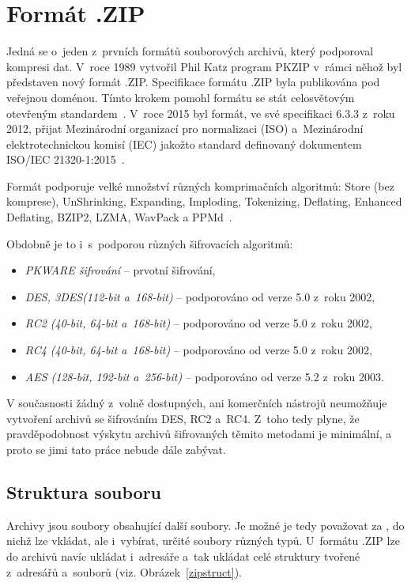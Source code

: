 \section{Formát .ZIP}
Jedná se o~jeden z~prvních formátů souborových archivů, který podporoval kompresi dat. V~roce 1989
vytvořil Phil Katz program PKZIP v~rámci něhož byl představen nový formát .ZIP. Specifikace
formátu .ZIP byla publikována pod veřejnou doménou. Tímto krokem pomohl formátu se stát
celosvětovým otevřeným standardem~\cite{PKWARE:2015}. V~roce 2015 byl formát, ve své specifikaci
6.3.3 z~roku 2012, přijat Mezinárodní organizací pro normalizaci (ISO) a~Mezinárodní
elektrotechnickou komisí (IEC) jakožto standard definovaný dokumentem ISO/IEC
21320-1:2015~\cite{ISOIEC:2015}.

 Formát podporuje velké množství různých komprimačních algoritmů: Store (bez komprese),
UnShrinking, Expanding, Imploding, Tokenizing, Deflating, Enhanced Deflating, BZIP2, LZMA, WavPack
a PPMd~\cite{PKWARE:2014}. 

 Obdobně je to i~s~podporou různých šifrovacích algoritmů:
\begin{itemize}
    \item {\it PKWARE šifrování} -- prvotní šifrování,
    \item {\it DES, 3DES(112-bit a~168-bit)} -- podporováno od verze 5.0 z~roku 2002,
    \item {\it RC2 (40-bit, 64-bit a~168-bit)} -- podporováno od verze 5.0 z~roku 2002,
    \item {\it RC4 (40-bit, 64-bit a~168-bit)} -- podporováno od verze 5.0 z~roku 2002,
    \item {\it AES (128-bit, 192-bit a~256-bit)} -- podporováno od verze 5.2 z~roku 2003.
\end{itemize}
V současnosti žádný z~volně dostupných, ani komerčních nástrojů neumožňuje vytvoření archivů se
šifrováním DES, RC2 a~RC4. Z~toho tedy plyne, že pravděpodobnost výskytu archivů šifrovaných těmito
metodami je minimální, a proto se jimi tato práce nebude dále zabývat.

\subsection{Struktura souboru}
\label{ssec:zip_struct}
Archivy jsou soubory obsahující další soubory. Je možné je tedy považovat za , do nichž
lze vkládat, ale i~vybírat, určité soubory různých typů. U~formátu .ZIP lze do archivů navíc ukládat
i~adresáře a~tak ukládat celé struktury tvořené z~adresářů a~souborů (viz. Obrázek~\ref{zipstruct}).

